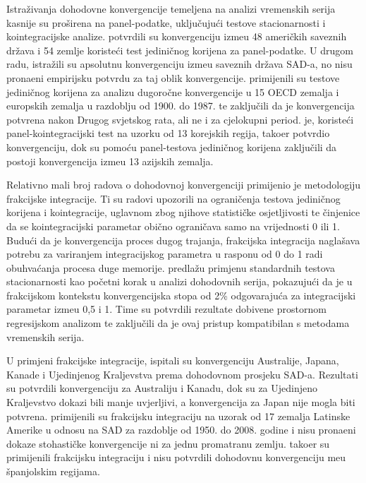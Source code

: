 \documentclass{crebsshr}
\begin{document}
Istra\v{z}ivanja dohodovne konvergencije temeljena na analizi vremenskih serija kasnije su pro\v{s}irena na panel-podatke, uklju\v{c}uju\'ci testove stacionarnosti i kointegracijske analize. \cite{evans-karras:96a} potvrdili su konvergenciju izme\dj{}u 48 ameri\v{c}kih saveznih dr\v{z}ava i 54 zemlje koriste\'ci test jedini\v{c}nog korijena za panel-podatke. U drugom radu, \cite{evans-karras:96b} istra\v{z}ili su apsolutnu konvergenciju izme\dj{}u saveznih dr\v{z}ava SAD-a, no nisu prona\dj{}eni empirijsku potvrdu za taj oblik konvergencije. \cite{fleissig-strauss:01} primijenili su testove jedini\v{c}nog korijena za analizu dugoro\v{c}ne konvergencije u 15 OECD zemalja i europskih zemalja u razdoblju od 1900. do 1987. te zaklju\v{c}ili da je konvergencija potvr\dj{}ena nakon Drugog svjetskog rata, ali ne i za cjelokupni period. \cite{kim:05} je, koriste\'ci panel-kointegracijski test na uzorku od 13 korejskih regija, tako\dj{}er potvrdio konvergenciju, dok su \cite{carrion:05} pomo\'cu panel-testova jedini\v{c}nog korijena zaklju\v{c}ili da postoji konvergencija izme\dj{}u 13 azijskih zemalja.

Relativno mali broj radova o dohodovnoj konvergenciji primijenio je metodologiju frakcijske integracije. Ti su radovi upozorili na ograni\v{c}enja testova jedini\v{c}nog korijena i kointegracije, uglavnom zbog njihove statisti\v{c}ke osjetljivosti te \v{c}injenice da se kointegracijski parametar obi\v{c}no ograni\v{c}ava samo na vrijednosti 0 ili 1. Budu\'ci da je konvergencija proces dugog trajanja, frakcijska integracija nagla\v{s}ava potrebu za variranjem integracijskog parametra u rasponu od 0 do 1 radi obuhvaćanja procesa duge memorije. \cite{michelacci-zaffaroni:00} predla\v{z}u primjenu standardnih testova stacionarnosti kao po\v{c}etni korak u analizi dohodovnih serija, pokazuju\'ci da je u frakcijskom kontekstu konvergencijska stopa od 2\% odgovaraju\'ca za integracijski parametar izme\dj{}u 0,5 i 1. Time su potvrdili rezultate dobivene prostornom regresijskom analizom te zaklju\v{c}ili da je ovaj pristup kompatibilan s metodama vremenskih serija.

U primjeni frakcijske integracije, \cite{cunado:03} ispitali su konvergenciju Australije, Japana, Kanade i Ujedinjenog Kraljevstva prema dohodovnom prosjeku SAD-a. Rezultati su potvrdili konvergenciju za Australiju i Kanadu, dok su za Ujedinjeno Kraljevstvo dokazi bili manje uvjerljivi, a konvergencija za Japan nije mogla biti potvr\dj{}ena. \cite{ayala:12} primijenili su frakcijsku integraciju na uzorak od 17 zemalja Latinske Amerike u odnosu na SAD za razdoblje od 1950. do 2008. godine i nisu prona\dj{}eni dokaze stohasti\v{c}ke konvergencije ni za jednu promatranu zemlju. \cite{fleissig-strauss:01} tako\dj{}er su primijenili frakcijsku integraciju i nisu potvrdili dohodovnu konvergenciju me\dj{}u \v{s}panjolskim regijama.
\end{document}
